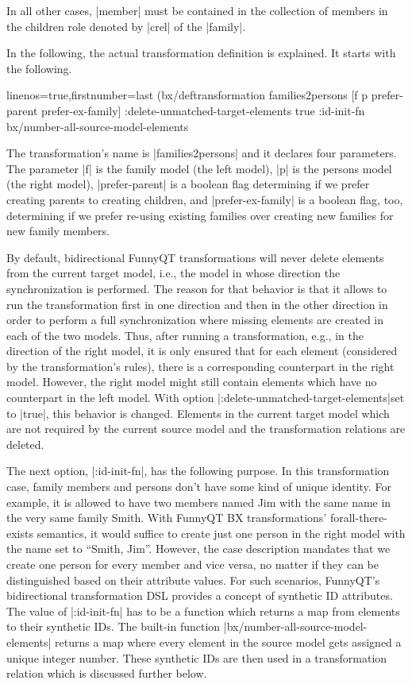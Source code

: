 \documentclass[a4paper]{article}
\newcommand{\code}{\clojureinline}
\begin{document}
In all other cases, \code|member| must be contained in the collection of
members in the children role denoted by \code|crel| of the \code|family|.

In the following, the actual transformation definition is explained.  It starts
with the following.

\begin{clojurecode*}{linenos=true,firstnumber=last}
(bx/deftransformation families2persons [f p prefer-parent prefer-ex-family]
  :delete-unmatched-target-elements true
  :id-init-fn bx/number-all-source-model-elements
\end{clojurecode*}

The transformation's name is \code|families2persons| and it declares four
parameters.  The parameter \code|f| is the family model (the left model),
\code|p| is the persons model (the right model), \code|prefer-parent| is a
boolean flag determining if we prefer creating parents to creating children,
and \code|prefer-ex-family| is a boolean flag, too, determining if we prefer
re-using existing families over creating new families for new family members.

By default, bidirectional FunnyQT transformations will never delete elements
from the current target model, i.e., the model in whose direction the
synchronization is performed.  The reason for that behavior is that it allows
to run the transformation first in one direction and then in the other
direction in order to perform a full synchronization where missing elements are
created in each of the two models.  Thus, after running a transformation, e.g.,
in the direction of the right model, it is only ensured that for each element
(considered by the transformation's rules), there is a corresponding
counterpart in the right model.  However, the right model might still contain
elements which have no counterpart in the left model.  With option
\code|:delete-unmatched-target-elements|set to \code|true|, this behavior is
changed.  Elements in the current target model which are not required by the
current source model and the transformation relations are deleted.

The next option, \code|:id-init-fn|, has the following purpose.  In this
transformation case, family members and persons don't have some kind of unique
identity.  For example, it is allowed to have two members named Jim with the
same name in the very same family Smith.  With FunnyQT BX transformations'
forall-there-exists semantics, it would suffice to create just one person in
the right model with the name set to ``Smith, Jim''.  However, the case
description mandates that we create one person for every member and vice versa,
no matter if they can be distinguished based on their attribute values.  For
such scenarios, FunnyQT's bidirectional transformation DSL provides a concept
of synthetic ID attributes.  The value of \code|:id-init-fn| has to be a
function which returns a map from elements to their synthetic IDs.  The
built-in function \code|bx/number-all-source-model-elements| returns a map
where every element in the source model gets assigned a unique integer number.
These synthetic IDs are then used in a transformation relation which is
discussed further below.
\end{document}
